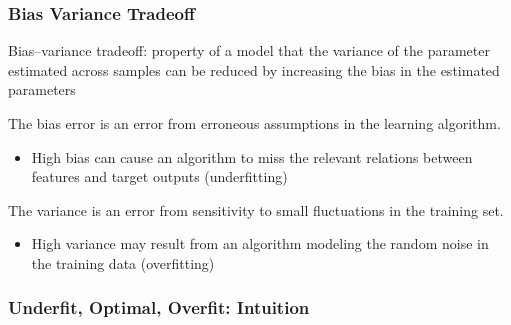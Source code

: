 \documentclass{beamer}
\newenvironment{wideitemize}{\itemize\addtolength{\itemsep}{10pt}}{\enditemize}
\begin{document}
  \begin{frame}
    \frametitle{Bias Variance Tradeoff}


    \begin{wideitemize}
    \item Bias–variance tradeoff: property of a model that the variance of the parameter estimated across samples can be reduced by increasing the bias in the estimated parameters
      
    \item The bias error is an error from erroneous assumptions in the learning algorithm.
      \begin{itemize}
      \item High bias can cause an algorithm to miss the relevant relations between features and target outputs (underfitting)
      \end{itemize}

        
    \item The variance is an error from sensitivity to small fluctuations in the training set.
      \begin{itemize}
      \item High variance may result from an algorithm modeling the random noise in the training data (overfitting)
      \end{itemize}             
    \end{wideitemize}
      
  \end{frame}


\begin{frame}
  \frametitle{Underfit, Optimal, Overfit: Intuition}
\end{frame}
\end{document}
